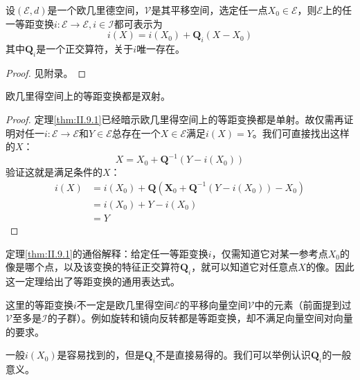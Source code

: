 \documentclass[main.tex]{subfiles}
\begin{document}
\begin{theorem}[等距变换的表示定理]\label{thm:II.9.1}
设$\left(\mathcal{E},d\right)$是一个欧几里德空间，$\mathcal{V}$是其平移空间，选定任一点$X_0\in\mathcal{E}$，则$\mathcal{E}$上的任一等距变换$i:\mathcal{E}\rightarrow\mathcal{E},i\in\mathcal{I}$都可表示为
\[
i\left(X\right)=i\left(X_0\right)+\mathbf{Q}_i\left(X-X_0\right)
\]
其中$\mathbf{Q}_i$是一个正交算符，关于$i$唯一存在。
\end{theorem}
\begin{proof}
见附录。
\end{proof}

\begin{corollary}
欧几里得空间上的等距变换都是双射。
\end{corollary}
\begin{proof}
定理\ref{thm:II.9.1}已经暗示欧几里得空间上的等距变换都是单射。故仅需再证明对任一$i:
\mathcal{E}\rightarrow\mathcal{E}$和$Y\in\mathcal{E}$总存在一个$X\in\mathcal{E}$满足$i\left(X\right)=Y$。我们可直接找出这样的$X$：
\[
X=X_0+\mathbf{Q}^{-1}\left(Y-i\left(X_0\right)\right)
\]
验证这就是满足条件的$X$：
\begin{align*}
i\left(X\right)&=i\left(X_0\right)+\mathbf{Q}\left(\mathbf{X}_0+\mathbf{Q}^{-1}\left(Y-i\left(X_0\right)\right)-X_0\right)\\
&=i\left(X_0\right)+Y-i\left(X_0\right)\\
&=Y
\end{align*}
\end{proof}

定理\ref{thm:II.9.1}的通俗解释：给定任一等距变换$i$，仅需知道它对某一参考点$X_0$的像是哪个点，以及该变换的特征正交算符$\mathbf{Q}_i$，就可以知道它对任意点$X$的像。因此这一定理给出了等距变换的通用表达式。

这里的等距变换$i$不一定是欧几里得空间$\mathcal{E}$的平移向量空间$\mathcal{V}$中的元素（前面提到过$\mathcal{V}$至多是$\mathcal{I}$的子群）。例如旋转和镜向反转都是等距变换，却不满足向量空间对向量的要求。

一般$i\left(X_0\right)$是容易找到的，但是$\mathbf{Q}_i$不是直接易得的。我们可以举例认识$\mathbf{Q}_i$的一般意义。
\end{document}
